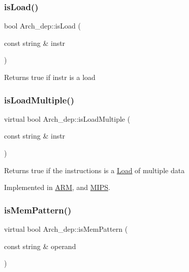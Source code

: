 \mbox{\label{classArch__dep_ac412d77ad36470a99dc562d3e318d78f}} 
\subsubsection{\texorpdfstring{is\+Load()}{isLoad()}}
{\footnotesize\ttfamily bool Arch\+\_\+dep\+::is\+Load (\begin{DoxyParamCaption}\item[{const string \&}]{instr }\end{DoxyParamCaption})}

Returns true if instr is a load \mbox{\label{classArch__dep_a1d8126e04db14a502e3b26be2f032552}} 
\subsubsection{\texorpdfstring{is\+Load\+Multiple()}{isLoadMultiple()}}
{\footnotesize\ttfamily virtual bool Arch\+\_\+dep\+::is\+Load\+Multiple (\begin{DoxyParamCaption}\item[{const string \&}]{instr }\end{DoxyParamCaption})\hspace{0.3cm}{\ttfamily [pure virtual]}}

Returns true if the instructions is a \hyperlink{classLoad}{Load} of multiple data 

Implemented in \hyperlink{classARM_a426d805ed2f8ff041c2904b08f4f8953}{A\+RM}, and \hyperlink{classMIPS_aeb0b38a8be26d938889beb59ee1a98fb}{M\+I\+PS}.

\mbox{\label{classArch__dep_aa965a7ac1af14109f60aa2ceab99b6d6}} 
\subsubsection{\texorpdfstring{is\+Mem\+Pattern()}{isMemPattern()}}
{\footnotesize\ttfamily virtual bool Arch\+\_\+dep\+::is\+Mem\+Pattern (\begin{DoxyParamCaption}\item[{const string \&}]{operand }\end{DoxyParamCaption})\hspace{0.3cm}{\ttfamily [pure virtual]}}

